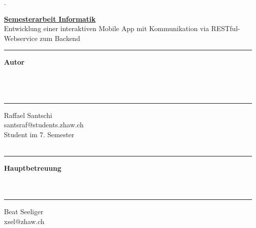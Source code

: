 %
%

\begin{titlepage}


\begin{minipage}[b]{0.117\textwidth}
\hskip 0.05cm
\end{minipage}
\begin{minipage}[b]{0.91\textwidth}
\begin{tiny}.\end{tiny}\vskip 2.8cm
	{\huge
	
	\textbf{\underline{Semesterarbeit Informatik}}\\
	
	
	Entwicklung einer interaktiven Mobile App mit Kommunikation via RESTful-Webservice zum Backend
	\vskip 0.5cm}
	
	\begin{minipage}[b]{0.27\textwidth}
	\hrule\vskip 0.5cm
		\textbf{Autor}\\
		\\
		\\
		\\
	\end{minipage}
	\begin{minipage}[b]{0.03\textwidth}
	\hskip 0.5cm
	\end{minipage}
	\begin{minipage}[b]{0.7\textwidth}
	\hrule\vskip 0.5cm
		Raffael Santschi\\
		santsraf@students.zhaw.ch\\
		Student im 7. Semester\\
		\\
	\end{minipage}
	
	\begin{minipage}[b]{0.27\textwidth}
	\hrule\vskip 0.5cm
		\textbf{Hauptbetreuung}\\
		\\
		\\
	\end{minipage}
	\begin{minipage}[b]{0.03\textwidth}
	\hskip 0.5cm
	\end{minipage}
	\begin{minipage}[b]{0.7\textwidth}
	\hrule\vskip 0.5cm
		Beat Seeliger\\
		xsel@zhaw.ch\\
		\\
	\end{minipage}
	

\end{minipage}
\end{titlepage}
